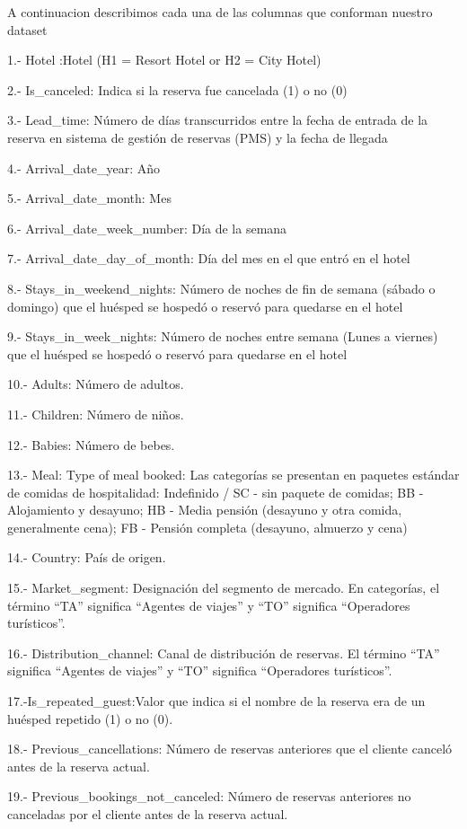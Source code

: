 \documentclass[]{article}
\begin{document}
A continuacion describimos cada una de las columnas que conforman
nuestro dataset

1.- Hotel :Hotel (H1 = Resort Hotel or H2 = City Hotel)

2.- Is\_canceled: Indica si la reserva fue cancelada (1) o no (0)

3.- Lead\_time: Número de días transcurridos entre la fecha de entrada
de la reserva en sistema de gestión de reservas (PMS) y la fecha de
llegada

4.- Arrival\_date\_year: Año

5.- Arrival\_date\_month: Mes

6.- Arrival\_date\_week\_number: Día de la semana

7.- Arrival\_date\_day\_of\_month: Día del mes en el que entró en el
hotel

8.- Stays\_in\_weekend\_nights: Número de noches de fin de semana
(sábado o domingo) que el huésped se hospedó o reservó para quedarse en
el hotel

9.- Stays\_in\_week\_nights: Número de noches entre semana (Lunes a
viernes) que el huésped se hospedó o reservó para quedarse en el hotel

10.- Adults: Número de adultos.

11.- Children: Número de niños.

12.- Babies: Número de bebes.

13.- Meal: Type of meal booked: Las categorías se presentan en paquetes
estándar de comidas de hospitalidad: Indefinido / SC - sin paquete de
comidas; BB - Alojamiento y desayuno; HB - Media pensión (desayuno y
otra comida, generalmente cena); FB - Pensión completa (desayuno,
almuerzo y cena)

14.- Country: País de origen.

15.- Market\_segment: Designación del segmento de mercado. En
categorías, el término ``TA'' significa ``Agentes de viajes'' y ``TO''
significa ``Operadores turísticos''.

16.- Distribution\_channel: Canal de distribución de reservas. El
término ``TA'' significa ``Agentes de viajes'' y ``TO'' significa
``Operadores turísticos''.

17.-Is\_repeated\_guest:Valor que indica si el nombre de la reserva era
de un huésped repetido (1) o no (0).

18.- Previous\_cancellations: Número de reservas anteriores que el
cliente canceló antes de la reserva actual.

19.- Previous\_bookings\_not\_canceled: Número de reservas anteriores no
canceladas por el cliente antes de la reserva actual.
\end{document}
